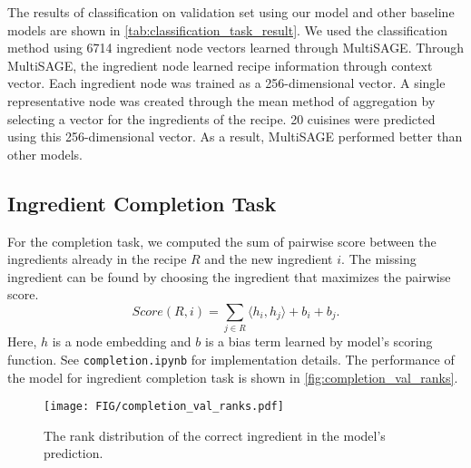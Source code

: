   The results of classification on validation set using our model and other baseline models are shown in \autoref{tab:classification_task_result}.  
  We used the classification method using 6714 ingredient node vectors learned through MultiSAGE. Through MultiSAGE, the ingredient node learned recipe information through context vector. Each ingredient node was trained as a 256-dimensional vector. A single representative node was created through the mean method of aggregation by selecting a vector for the ingredients of the recipe. 20 cuisines were predicted using this 256-dimensional vector. As a result, MultiSAGE performed better than other models.
  
 \subsection{Ingredient Completion Task}
 For the completion task, we computed the sum of pairwise score between the ingredients already in the recipe $R$ and the new ingredient $i$. The missing ingredient can be found by choosing the ingredient that maximizes the pairwise score.
 \begin{equation}
     Score(R, i) = \sum_{j \in R} \langle h_i, h_j \rangle + b_i + b_j.
 \end{equation}
 Here, $h$ is a node embedding and $b$ is a bias term learned by model's scoring function. See \texttt{completion.ipynb} for implementation details. The performance of the model for ingredient completion task is shown in \autoref{fig:completion_val_ranks}.

 \begin{figure}[btp!]
     \texttt{[image: FIG/completion\_val\_ranks.pdf]}
     \caption{\label{fig:completion_val_ranks} The rank distribution of the correct ingredient in the model's prediction.}
 \end{figure}

\begin{comment}
\begin{enumerate}
    \item MultiSAGE
    \begin{enumerate}
        \item Node Embedding
        \newline fig1 : heteogeneous node enbedding
        \item evaluate node Embedding
    \end{enumerate}
    \item Classification task
    \begin{enumerate}
        \item Evaluate models
        \newline fig2 models performance
    \end{enumerate}
    \item Completion task
    \begin{enumerate}
        \item Evaluate models
        \newline fig3 model performance
    \end{enumerate}
\end{enumerate}
\end{comment}

